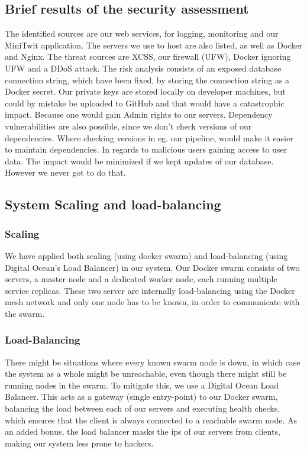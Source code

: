 \subsection{Brief results of the security assessment}
The identified sources are our web services, for logging, monitoring and our MiniTwit application.
The servers we use to host are also listed, as well as Docker and Nginx.
The threat sources are XCSS, our firewall (UFW), Docker ignoring UFW and a DDoS attack.
The risk analysis consists of an exposed database connection string, which have been fixed, by storing the connection string as a Docker secret. Our private keys are stored locally on developer machines, but could by mistake be uploaded to GitHub and that would have a catastrophic impact. Because one would gain Admin rights to our servers.
Dependency vulnerabilities are also possible, since we don't check versions of our dependencies. Where checking versions in eg. our pipeline, would make it easier to maintain dependencies.
In regards to malicious users gaining access to user data. The impact would be minimized if we kept updates of our database. However we never got to do that.

\subsection{System Scaling and load-balancing}
\subsubsection{Scaling}
We have applied both scaling (using docker swarm) and load-balancing (using Digital Ocean's Load Balancer) in our system. 
Our Docker swarm consists of two servers, a master node and a dedicated worker node, each running multiple service replicas. 
These two server are internally load-balancing using the Docker mesh network and only one node has to be known, in order to communicate with the swarm.

\subsubsection{Load-Balancing}
There might be situations where every known swarm node is down, in which case the system as a whole might be unreachable, even though there might still be running nodes in the swarm.
\newline
To mitigate this, we use a Digital Ocean Load Balancer. This acts as a gateway (single entry-point) to our Docker swarm, balancing the load between each of our servers and executing health checks, which ensures that the client is always connected to a reachable swarm node.
\newline
As an added bonus, the load balancer masks the ips of our servers from clients, making our system less prone to hackers.

